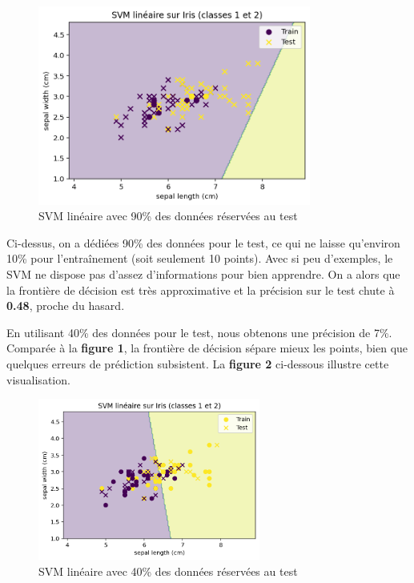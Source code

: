 \documentclass[
  12pt,
]{article}
\begin{document}
\begin{figure}[H]
    \centering
    \includegraphics[width=0.8\textwidth]{vis/classif_90test_10train.png}
    \caption{SVM linéaire avec 90\% des données réservées au test}
    \label{fig:svm_iris_90test_10train}
\end{figure}

Ci-dessus, on a dédiées 90\% des données pour le test, ce qui ne laisse
qu'environ 10\% pour l'entraînement (soit seulement 10 points). Avec si
peu d'exemples, le SVM ne dispose pas d'assez d'informations pour bien
apprendre. On a alors que la frontière de décision est très
approximative et la précision sur le test chute à \textbf{0.48}, proche
du hasard.

En utilisant 40\% des données pour le test, nous obtenons une précision
de 7\%. Comparée à la \textbf{figure 1}, la frontière de décision sépare
mieux les points, bien que quelques erreurs de prédiction subsistent. La
\textbf{figure 2} ci-dessous illustre cette visualisation.

\begin{figure}[H]
    \centering
    \includegraphics[width=0.65\textwidth]{vis/classif_40test_60train.png}
    \caption{SVM linéaire avec 40\% des données réservées au test}
    \label{fig:svm_iris_40test_60train}
\end{figure}
\end{document}
